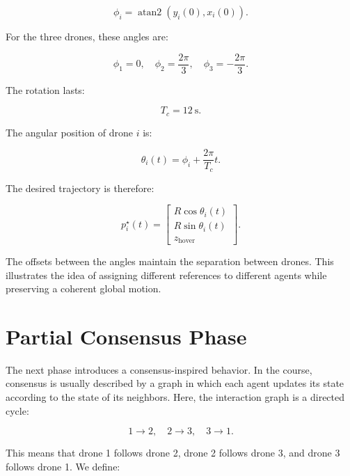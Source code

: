 \begin{equation}
    \phi_i=\operatorname{atan2}(y_i(0),x_i(0)).
\end{equation}

For the three drones, these angles are:

\begin{equation}
    \phi_1=0, \quad \phi_2=\frac{2\pi}{3}, \quad \phi_3=-\frac{2\pi}{3}.
\end{equation}

The rotation lasts:

\begin{equation}
    T_c=12 \ \text{s}.
\end{equation}

The angular position of drone $i$ is:

\begin{equation}
    \theta_i(t)=\phi_i+\frac{2\pi}{T_c}t.
\end{equation}

The desired trajectory is therefore:

\begin{equation}
    p_i^{\star}(t)=
    \begin{bmatrix}
    R\cos\theta_i(t) \\
    R\sin\theta_i(t) \\
    z_{\text{hover}}
    \end{bmatrix}.
\end{equation}

The offsets between the angles maintain the separation between drones. This illustrates the idea of assigning different references to different agents while preserving a coherent global motion.

\section{Partial Consensus Phase}

The next phase introduces a consensus-inspired behavior. In the course, consensus is usually described by a graph in which each agent updates its state according to the state of its neighbors. Here, the interaction graph is a directed cycle:

\begin{equation}
    1\rightarrow2, \quad 2\rightarrow3, \quad 3\rightarrow1.
\end{equation}

This means that drone 1 follows drone 2, drone 2 follows drone 3, and drone 3 follows drone 1. We define:

